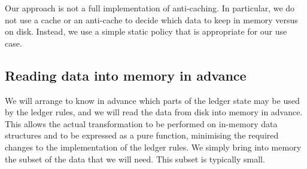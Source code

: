 \documentclass[11pt,a4paper]{article}
\begin{document}
Our approach is not a full implementation of anti-caching. In particular, we
do not use a cache or an anti-cache to decide which data to keep in memory
versus on disk. Instead, we use a simple static policy that is appropriate for
our use case.

\subsection{Reading data into memory in advance}
\label{reading-data-into-memory-in-advance}

We will arrange to know in advance which parts of the ledger state may be used
by the ledger rules, and we will read the data from disk into memory in advance.
This allows the actual transformation to be performed on in-memory data
structures and to be expressed as a pure function, minimising the required
changes to the implementation of the ledger rules. We simply bring into memory
the subset of the data that we will need. This subset is typically small.

\begin{center}
\end{center}
\end{document}
